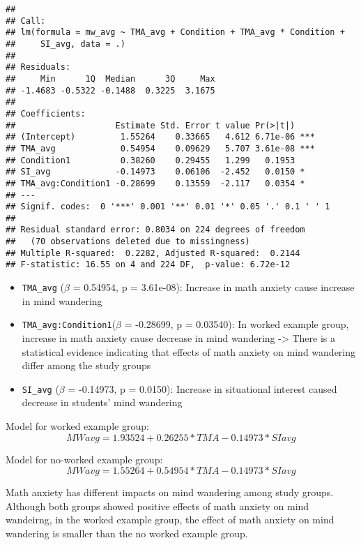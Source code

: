 \documentclass[
]{article}
\begin{document}
\begin{verbatim}
## 
## Call:
## lm(formula = mw_avg ~ TMA_avg + Condition + TMA_avg * Condition + 
##     SI_avg, data = .)
## 
## Residuals:
##     Min      1Q  Median      3Q     Max 
## -1.4683 -0.5322 -0.1488  0.3225  3.1675 
## 
## Coefficients:
##                    Estimate Std. Error t value Pr(>|t|)    
## (Intercept)         1.55264    0.33665   4.612 6.71e-06 ***
## TMA_avg             0.54954    0.09629   5.707 3.61e-08 ***
## Condition1          0.38260    0.29455   1.299   0.1953    
## SI_avg             -0.14973    0.06106  -2.452   0.0150 *  
## TMA_avg:Condition1 -0.28699    0.13559  -2.117   0.0354 *  
## ---
## Signif. codes:  0 '***' 0.001 '**' 0.01 '*' 0.05 '.' 0.1 ' ' 1
## 
## Residual standard error: 0.8034 on 224 degrees of freedom
##   (70 observations deleted due to missingness)
## Multiple R-squared:  0.2282, Adjusted R-squared:  0.2144 
## F-statistic: 16.55 on 4 and 224 DF,  p-value: 6.72e-12
\end{verbatim}

\begin{itemize}
\item
  \texttt{TMA\_avg} (\(\beta\) = 0.54954, p = 3.61e-08): Increase in
  math anxiety cause increase in mind wandering
\item
  \texttt{TMA\_avg:Condition1}(\(\beta\) = -0.28699, p = 0.03540): In
  worked example group, increase in math anxiety cause decrease in mind
  wandering -\textgreater{} There is a statistical evidence indicating
  that effects of math anxiety on mind wandering differ among the study
  groups
\item
  \texttt{SI\_avg} (\(\beta\) = -0.14973, p = 0.0150): Increase in
  situational interest caused decrease in students' mind wandering
\end{itemize}

Model for worked example group:
\[MWavg = 1.93524 + 0.26255 * TMA - 0.14973 * SIavg\]

Model for no-worked example group:
\[MWavg = 1.55264 + 0.54954 * TMA - 0.14973 * SIavg\]

Math anxiety has different impacts on mind wandering among study groups.
Although both groups showed positive effects of math anxiety on mind
wandeirng, in the worked example group, the effect of math anxiety on
mind wandering is smaller than the no worked example group.
\end{document}
